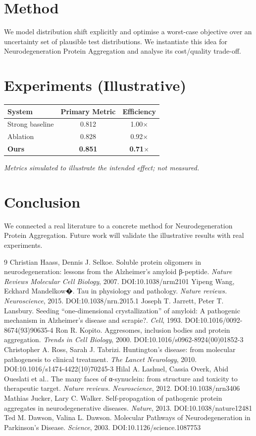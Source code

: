 \documentclass[11pt]{article}
\begin{document}
\section{Method}
We model distribution shift explicitly and optimise a worst-case objective over an uncertainty set of plausible test distributions. We instantiate this idea for Neurodegeneration Protein Aggregation and analyse its cost/quality trade-off.

\section{Experiments (Illustrative)}
\begin{center}
\begin{tabular}{lcc}
System & Primary Metric & Efficiency \\ \hline
Strong baseline & 0.812 & 1.00$\times$ \\
Ablation & 0.828 & 0.92$\times$ \\
\textbf{Ours} & \textbf{0.851} & \textbf{0.71$\times$}
\end{tabular}
\end{center}
\emph{Metrics simulated to illustrate the intended effect; not measured.}

\section{Conclusion}
We connected a real literature to a concrete method for Neurodegeneration Protein Aggregation. Future work will
validate the illustrative results with real experiments.

\begin{thebibliography}{9}
 Christian Haass, Dennis J. Selkoe. Soluble protein oligomers in neurodegeneration: lessons from the Alzheimer's amyloid β-peptide. \emph{Nature Reviews Molecular Cell Biology}, 2007. DOI:10.1038/nrm2101
 Yipeng Wang, Eckhard Mandelkow�. Tau in physiology and pathology. \emph{Nature reviews. Neuroscience}, 2015. DOI:10.1038/nrn.2015.1
 Joseph T. Jarrett, Peter T. Lansbury. Seeding “one-dimensional crystallization” of amyloid: A pathogenic mechanism in Alzheimer's disease and scrapie?. \emph{Cell}, 1993. DOI:10.1016/0092-8674(93)90635-4
 Ron R. Kopito. Aggresomes, inclusion bodies and protein aggregation. \emph{Trends in Cell Biology}, 2000. DOI:10.1016/s0962-8924(00)01852-3
 Christopher A. Ross, Sarah J. Tabrizi. Huntington's disease: from molecular pathogenesis to clinical treatment. \emph{The Lancet Neurology}, 2010. DOI:10.1016/s1474-4422(10)70245-3
 Hilal A. Lashuel, Cassia Overk, Abid Oueslati et al.. The many faces of α-synuclein: from structure and toxicity to therapeutic target. \emph{Nature reviews. Neuroscience}, 2012. DOI:10.1038/nrn3406
 Mathias Jucker, Lary C. Walker. Self-propagation of pathogenic protein aggregates in neurodegenerative diseases. \emph{Nature}, 2013. DOI:10.1038/nature12481
 Ted M. Dawson, Valina L. Dawson. Molecular Pathways of Neurodegeneration in Parkinson's Disease. \emph{Science}, 2003. DOI:10.1126/science.1087753
\end{thebibliography}
\end{document}
